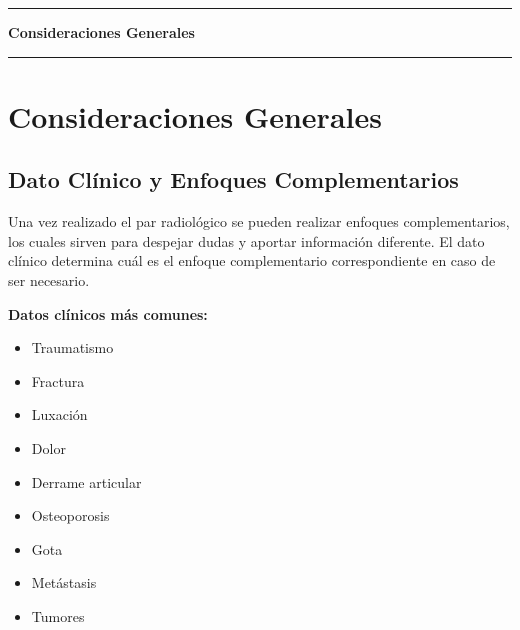 \clearpage
\onecolumn
\thispagestyle{empty}
\vspace*{\fill}
\begin{center}
	{\color{radblue}\rule{\linewidth}{2pt}}\par
	\vspace{6mm}
	{\Huge\bfseries\color{radblue} Consideraciones Generales}\par
	\vspace{6mm}
	{\color{radblue}\rule{\linewidth}{2pt}}
\end{center}
\vspace*{\fill}
\clearpage
\twocolumn
\pagestyle{contenido}%




	
	\section{Consideraciones Generales}
	
	\subsection{Dato Clínico y Enfoques Complementarios}
	
	Una vez realizado el par radiológico se pueden realizar enfoques complementarios, los cuales sirven para despejar dudas y aportar información diferente. El dato clínico determina cuál es el enfoque complementario correspondiente en caso de ser necesario.
	
	\textbf{Datos clínicos más comunes:}
	\begin{itemize}
		\item Traumatismo
		\item Fractura
		\item Luxación
		\item Dolor
		\item Derrame articular
		\item Osteoporosis
		\item Gota
		\item Metástasis
		\item Tumores
	\end{itemize}
	
